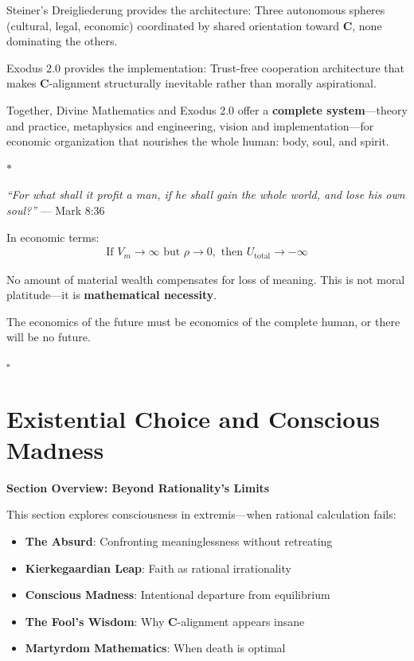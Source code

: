 \documentclass[11pt,a4paper]{article}
\theoremstyle{definition}
\theoremstyle{remark}
\begin{document}
\begin{small}
\begin{enumerate}
Steiner's Dreigliederung provides the architecture: Three autonomous spheres (cultural, legal, economic) coordinated by shared orientation toward \(\mathbf{C}\), none dominating the others.

Exodus 2.0 provides the implementation: Trust-free cooperation architecture that makes \(\mathbf{C}\)-alignment structurally inevitable rather than morally aspirational.

Together, Divine Mathematics and Exodus 2.0 offer a \textbf{complete system}—theory and practice, metaphysics and engineering, vision and implementation—for economic organization that nourishes the whole human: body, soul, and spirit.

\begin{center}
\(\ast\)
\end{center}

\textit{``For what shall it profit a man, if he shall gain the whole world, and lose his own soul?''} — Mark 8:36

In economic terms:
\begin{align}
\text{If } V_m \to \infty \text{ but } \rho \to 0, \text{ then } U_{\text{total}} \to -\infty
\end{align}

No amount of material wealth compensates for loss of meaning. This is not moral platitude—it is \textbf{mathematical necessity}.

The economics of the future must be economics of the complete human, or there will be no future.

\begin{center}
\(\square\)
\end{center}


\section{Existential Choice and Conscious Madness}

\begin{mdframed}[backgroundcolor=cyan!5,linewidth=2pt]
\textbf{Section Overview: Beyond Rationality's Limits}

This section explores consciousness in extremis—when rational calculation fails:

\begin{itemize}[nosep]
    \item \textbf{The Absurd}: Confronting meaninglessness without retreating
    \item \textbf{Kierkegaardian Leap}: Faith as rational irrationality
    \item \textbf{Conscious Madness}: Intentional departure from equilibrium
    \item \textbf{The Fool's Wisdom}: Why \(\mathbf{C}\)-alignment appears insane
    \item \textbf{Martyrdom Mathematics}: When death is optimal
\end{itemize}


\end{mdframed}
\end{enumerate}
\end{small}
\end{document}
